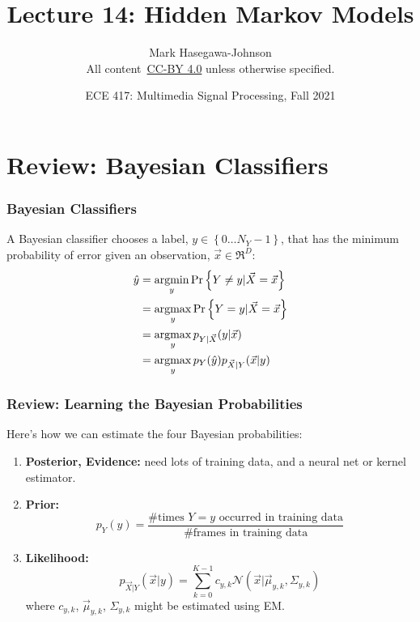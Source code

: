 \documentclass{beamer}
\title{Lecture 14: Hidden Markov Models}
\author{Mark Hasegawa-Johnson\\All content~\href{https://creativecommons.org/licenses/by/4.0/}{CC-BY 4.0} unless otherwise specified.}
\date{ECE 417: Multimedia Signal Processing, Fall 2021}
\newcommand{\argmax}{\operatornamewithlimits{argmax}}
\newcommand{\argmin}{\operatornamewithlimits{argmin}}
\begin{document}
\begin{frame}
  \maketitle
\end{frame}

\begin{frame}
  \tableofcontents
\end{frame}

\section[Review]{Review: Bayesian Classifiers}
\setcounter{subsection}{1}

\begin{frame}
  \frametitle{Bayesian Classifiers}
  
  A Bayesian classifier chooses a label, $y\in\left\{0\ldots N_Y-1\right\}$, that has
    the minimum probability of error given an observation,
    $\vec{x}\in\Re^D$:
  \begin{align*}
    \hat{y} &= \argmin_{y} \Pr\left\{Y \ne y|\vec{X}=\vec{x}\right\}\\
    &= \argmax_{y} \Pr\left\{Y = y|\vec{X}=\vec{x}\right\}\\
    &= \argmax_{y} p_{Y|\vec{X}}(y|\vec{x})\\
    &= \argmax_{y} p_Y(\hat{y}) p_{\vec{X}|Y}(\vec{x}|y)
  \end{align*}
\end{frame}

\begin{frame}
  \frametitle{Review: Learning the Bayesian Probabilities}
  Here's how we can estimate the four Bayesian probabilities:
  \begin{enumerate}
  \item {\bf Posterior, Evidence:} need lots of training data, and a neural net or kernel estimator.
  \item {\bf Prior:}
    \begin{displaymath}
      p_Y(y) = \frac{\mbox{\# times $Y=y$ occurred in training data}}{\mbox{\# frames in training data}}
    \end{displaymath}
  \item {\bf Likelihood:}
    \begin{displaymath}
      p_{\vec{X}|Y}(\vec{x}|y) = \sum_{k=0}^{K-1}c_{y,k}{\mathcal N}(\vec{x}|\vec\mu_{y,k},\Sigma_{y,k})
    \end{displaymath}
    where $c_{y,k}$, $\vec\mu_{y,k}$, $\Sigma_{y,k}$ might be estimated using EM.
  \end{enumerate}
\end{frame}
\end{document}
